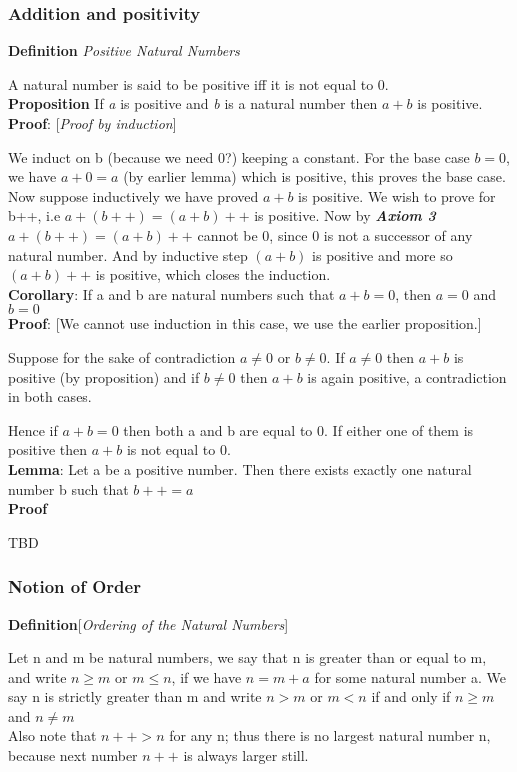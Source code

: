 \documentclass[10pt]{article}
\begin{document}
\subsubsection*{Addition and positivity}
\textbf{Definition} \emph{Positive Natural Numbers}

A natural number is said to be positive iff it is not equal to 0.
\\[6pt]
\textbf{Proposition}
If \emph{a} is positive and {\em b} is a natural number then $a + b$ is
positive.
\\[3pt]
\textbf{Proof}: [\emph{Proof by induction}]

We induct on b (because we need 0?) keeping a constant. For the base case
$b =0$, we have $a + 0 = a$ (by earlier lemma) which is positive, this proves
the base case. Now suppose inductively we have proved $a + b$ is positive. We
wish to prove for b++, i.e $a + (b++) = (a + b)++$ is positive.
Now by \emph{\textbf{Axiom 3}} $a + (b++) = (a + b)++$ cannot be 0, since 0 is
not a successor of any natural number. And by inductive step $(a+b)$ is positive
and more so $(a + b)++$ is positive, which closes the induction.
\\[6pt]
\textbf{Corollary}: If a and b are natural numbers such that $a + b = 0$, then
$a = 0$ and $ b = 0$
\\[3pt]
\textbf{Proof}: [We cannot use induction in this case, we use the earlier
  proposition.]

Suppose for the sake of contradiction $ a \ne 0$ or $b \ne 0$. If $a \ne 0$ then
$a + b$ is positive (by proposition) and if $b \ne 0$ then $a+b$ is again
positive, a contradiction in both cases.

Hence if $a+b = 0$ then both a and b are equal to 0. If either one of them is
positive then $a+b$ is not equal to 0.
\\[6pt]
\textbf{Lemma}: Let a be a positive number. Then there exists exactly one
natural number b such that $b++ = a$
\\[3pt]
\textbf{Proof}

TBD
\subsubsection*{Notion of Order}
\textbf{Definition}[\emph{Ordering of the Natural Numbers}]

  Let n and m be natural numbers, we say that n is greater than or equal to m,
  and write $n \geq m$ or $m \leq n$, if we have $n = m + a$ for some natural
  number a. We say n is strictly greater than m and write $n > m$ or $m < n$
  if and only if $n \geq m$ and $n \neq m$
  \\[6pt]
  Also note that $n++ > n$ for any n; thus there is no largest natural number n,
  because next number $n++$ is always larger still.
\end{document}
